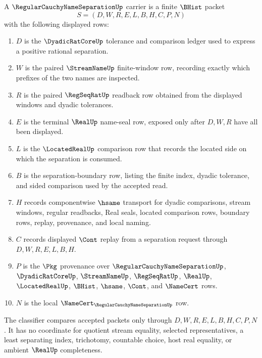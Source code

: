 \begin{definition}
\label{def:regular-cauchy-name-separation-carrier}
A $\RegularCauchyNameSeparationUp$ carrier is a finite $\BHist$ packet
$$
S=(D,W,R,E,L,B,H,C,P,N)
$$
with the following displayed rows:
\begin{enumerate}
\item $D$ is the $\DyadicRatCoreUp$ tolerance and comparison ledger used to express a positive rational separation.
\item $W$ is the paired $\StreamNameUp$ finite-window row, recording exactly which prefixes of the two names are inspected.
\item $R$ is the paired $\RegSeqRatUp$ readback row obtained from the displayed windows and dyadic tolerances.
\item $E$ is the terminal $\RealUp$ name-seal row, exposed only after $D,W,R$ have all been displayed.
\item $L$ is the $\LocatedRealUp$ comparison row that records the located side on which the separation is consumed.
\item $B$ is the separation-boundary row, listing the finite index, dyadic tolerance, and sided comparison used by the accepted read.
\item $H$ records componentwise $\hsame$ transport for dyadic comparisons, stream windows, regular readbacks, Real seals, located comparison rows, boundary rows, replay, provenance, and local naming.
\item $C$ records displayed $\Cont$ replay from a separation request through $D,W,R,E,L,B,H$.
\item $P$ is the $\Pkg$ provenance over $\RegularCauchyNameSeparationUp$, $\DyadicRatCoreUp$, $\StreamNameUp$, $\RegSeqRatUp$, $\RealUp$, $\LocatedRealUp$, $\BHist$, $\hsame$, $\Cont$, and $\NameCert$ rows.
\item $N$ is the local $\NameCert_{\RegularCauchyNameSeparationUp}$ row.
\end{enumerate}
The classifier compares accepted packets only through $D,W,R,E,L,B,H,C,P,N$. It has no coordinate for quotient stream equality, selected representatives, a least separating index, trichotomy, countable choice, host real equality, or ambient $\RealUp$ completeness.
\end{definition}


